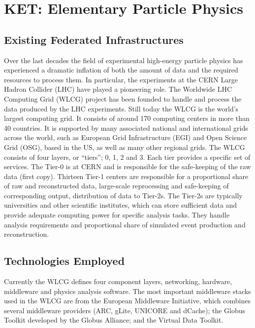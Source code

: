 \section{KET: Elementary Particle Physics}


\subsection{Existing Federated Infrastructures}
Over the last decades the field of experimental high-energy particle
physics has experienced a dramatic inflation of both the amount of
data and the required resources to process them. In particular, the
experiments at the CERN Large Hadron Collider (LHC) have played a
pioneering role. The Worldwide LHC Computing Grid (WLCG) project has
been founded to handle and process the data produced by the LHC
experiments. Still today  the WLCG is the world's largest computing
grid. It consists of around 170 computing centers in more than 40
countries.  It is supported by many associated national and
international grids across the world, such as European Grid
Infrastructure (EGI) and Open Science Grid (OSG), based in the US, as well as many other
regional grids.  The WLCG consists of four layers, or ``tiers''; 0, 1, 2
and 3. Each tier provides a specific set of services. The Tier-0 is at
CERN and is responsible for the safe-keeping of the raw data (first
copy). Thirteen Tier-1 centers are responsible for a proportional
share of raw and reconstructed data, large-scale reprocessing and
safe-keeping of corresponding output, distribution of data to Tier-2s. The Tier-2s are typically universities and other scientific
institutes, which can store sufficient data and provide adequate
computing power for specific analysis tasks. They handle analysis
requirements and proportional share of simulated event production and
reconstruction.


\subsection{Technologies Employed}
Currently the WLCG defines four component layers,  networking, hardware, middleware and
physics analysis software. The most important middleware stacks used
in the WLCG are from the European Middleware Initiative, which
combines several middleware providers (ARC, gLite, UNICORE and
dCache); the Globus Toolkit developed by the Globus Alliance; and the
Virtual Data Toolkit.



